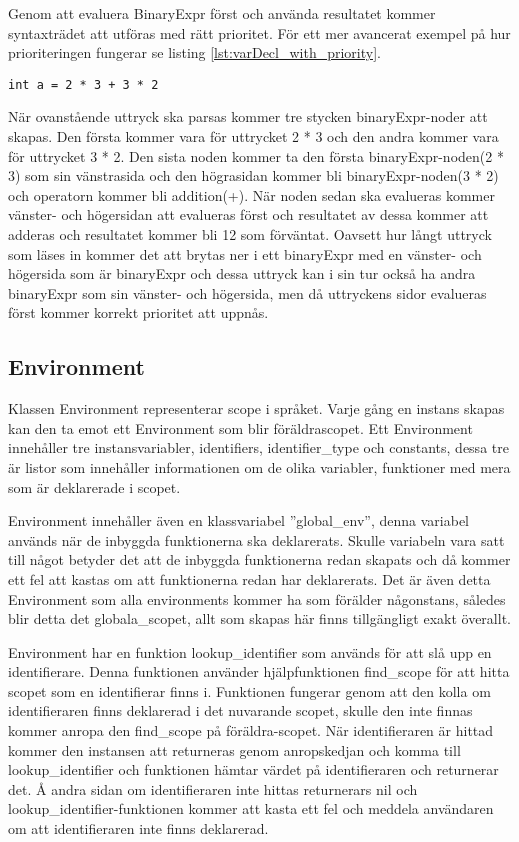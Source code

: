 \documentclass{TDP003mall}
\begin{document}
Genom att evaluera BinaryExpr först och använda resultatet kommer syntaxträdet att utföras med rätt prioritet.
För ett mer avancerat exempel på hur prioriteringen fungerar se listing \ref{lst:varDecl_with_priority}.

\begin{lstlisting}[caption=Variabel deklaration med prioritet, label=lst:varDecl_with_priority]
int a = 2 * 3 + 3 * 2
\end{lstlisting}

När ovanstående uttryck ska parsas kommer tre stycken binaryExpr-noder att skapas. Den första kommer vara för uttrycket 2 * 3 och den andra kommer vara för uttrycket 3 * 2. 
Den sista noden kommer ta den första binaryExpr-noden(2 * 3) som sin vänstrasida och den högrasidan kommer bli binaryExpr-noden(3 * 2) och operatorn kommer bli addition(+).
När noden sedan ska evalueras kommer vänster- och högersidan att evalueras först och resultatet av dessa kommer att adderas och resultatet kommer bli 12 som förväntat.
Oavsett hur långt uttryck som läses in kommer det att brytas ner i ett binaryExpr med en vänster- och högersida som är binaryExpr och dessa uttryck kan i sin tur också ha andra binaryExpr som sin vänster- och högersida, men då uttryckens sidor evalueras först kommer korrekt prioritet att uppnås.

\subsection{Environment}
Klassen Environment representerar scope i språket.
Varje gång en instans skapas kan den ta emot ett Environment som blir föräldrascopet.
Ett Environment innehåller tre instansvariabler, identifiers, identifier\_type och constants,
dessa tre är listor som innehåller informationen om de olika variabler, funktioner med mera som är deklarerade i scopet.

Environment innehåller även en klassvariabel ''global\_env'', denna variabel används när de inbyggda funktionerna ska deklarerats.
Skulle variabeln vara satt till något betyder det att de inbyggda funktionerna redan skapats och då kommer ett fel att kastas om att funktionerna redan har deklarerats. Det är även detta Environment som alla environments kommer ha som förälder någonstans, således blir detta det globala\_scopet, allt som skapas här finns tillgängligt exakt överallt.

Environment har en funktion lookup\_identifier som används för att slå upp en identifierare.
Denna funktionen använder hjälpfunktionen find\_scope för att hitta scopet som en identifierar finns i.
Funktionen fungerar genom att den kolla om identifieraren finns deklarerad i det nuvarande scopet, 
skulle den inte finnas kommer anropa den find\_scope på föräldra-scopet.
När identifieraren är hittad kommer den instansen att returneras genom anropskedjan och komma till lookup\_identifier och funktionen hämtar värdet på identifieraren och returnerar det.
Å andra sidan om identifieraren inte hittas returnerars nil och lookup\_identifier-funktionen kommer att kasta ett fel och meddela användaren om att identifieraren inte finns deklarerad.
\end{document}
